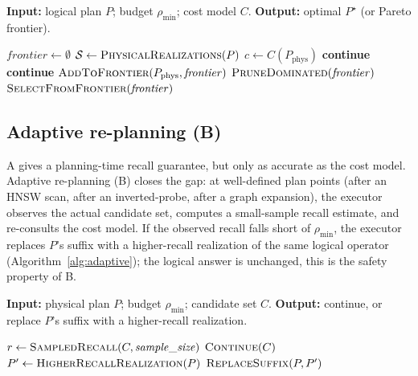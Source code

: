 \documentclass[sigconf]{acmart}
\theoremstyle{plain}
\theoremstyle{definition}
\theoremstyle{remark}
\begin{document}
\begin{algorithm}[t]
\caption{Approximation-aware CBO search (A).}\label{alg:cbo}
\textbf{Input:} logical plan $P$; budget $\rho_{\min}$; cost model $C$.
\textbf{Output:} optimal $P^\star$ (or Pareto frontier).
\begin{algorithmic}[1]
  \State $\mathit{frontier} \gets \emptyset$
  \State $\mathcal{S} \gets \Call{PhysicalRealizations}{P}$
    \State $c \gets C(P_{\mathrm{phys}})$
     \State \textbf{continue} \EndIf
      \State \textbf{continue} \EndIf
    \State $\Call{AddToFrontier}{P_{\mathrm{phys}}, \mathit{frontier}}$
    \State $\Call{PruneDominated}{\mathit{frontier}}$
  \EndFor
  \State \Return $\Call{SelectFromFrontier}{\mathit{frontier}}$
\end{algorithmic}
\end{algorithm}

\subsection{Adaptive re-planning (B)}\label{sec:cbo:adaptive}

A gives a planning-time recall guarantee, but only as
accurate as the cost model. Adaptive re-planning (B) closes
the gap: at well-defined plan points (after an HNSW scan,
after an inverted-probe, after a graph expansion), the
executor observes the actual candidate set, computes a
small-sample recall estimate, and re-consults the cost
model. If the observed recall falls short of $\rho_{\min}$,
the executor replaces $P$'s suffix with a higher-recall
realization of the same logical operator
(Algorithm~\ref{alg:adaptive}); the logical answer is
unchanged, this is the safety property of B.

\begin{algorithm}[t]
\caption{Adaptive re-planning at a plan point (B).}\label{alg:adaptive}
\textbf{Input:} physical plan $P$; budget $\rho_{\min}$; candidate set $C$.
\textbf{Output:} continue, or replace $P$'s suffix with a higher-recall realization.
\begin{algorithmic}[1]
  \State $r \gets \Call{SampledRecall}{C, \mathit{sample\_size}}$
   \State \Return $\Call{Continue}{C}$ \EndIf
  \State $P' \gets \Call{HigherRecallRealization}{P}$
  \State \Return $\Call{ReplaceSuffix}{P, P'}$
\end{algorithmic}
\end{algorithm}
\end{document}
